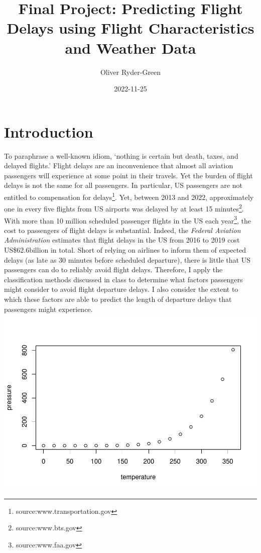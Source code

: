 \documentclass[
]{article}
\title{Final Project: Predicting Flight Delays using Flight
Characteristics and Weather Data}
\author{Oliver Ryder-Green}
\date{2022-11-25}
\begin{document}
\maketitle

\clearpage

\section{Introduction}

To paraphrase a well-known idiom, `nothing is certain but death, taxes,
and delayed flights.' Flight delays are an inconvenience that almost all
aviation passengers will experience at some point in their travels. Yet
the burden of flight delays is not the same for all passengers. In
particular, US passengers are not entitled to compensation for
delays\footnote{source:www.transportation.gov}. Yet, between 2013 and
2022, approximately one in every five flights from US airports was
delayed by at least 15 minutes\footnote{source:www.bts.gov}. With more
than 10 million scheduled passenger flights in the US each
year\footnote{source:www.faa.gov}, the cost to passengers of flight
delays is substantial. Indeed, the
\textit{Federal Aviation Administration} estimates that flight delays in
the US from 2016 to 2019 cost US\$62.6billion in total. Short of relying
on airlines to inform them of expected delays (as late as 30 minutes
before scheduled departure), there is little that US passengers can do
to reliably avoid flight delays. Therefore, I apply the classification
methods discussed in class to determine what factors passengers might
consider to avoid flight departure delays. I also consider the extent to
which these factors are able to predict the length of departure delays
that passengers might experience.\\

\includegraphics{Visualisation_Analysis_files/figure-latex/pressure-1.pdf}
\end{document}
